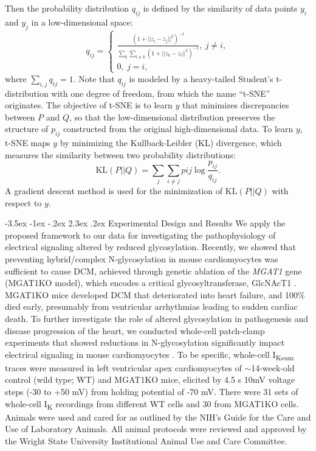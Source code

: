 \documentclass[11pt]{article}
\makeatletter
\renewcommand\section{\@startsection {section}{1}{\z@}%
                                   {-3.5ex \@plus -1ex \@minus -.2ex}%
                                   {2.3ex \@plus.2ex}%
                                   {\normalfont\fontfamily{phv}\fontsize{16}{19}\bfseries}}
\makeatother
\begin{document}
Then the probability distribution $q_{ij}$ is defined by the similarity of data points $y_i$ and $y_j$ in a low-dimensional space:
\begin{equation}
    q_{ij} = 
    \begin{cases}\frac{(1+||z_{i}-z_{j}||^{2})^{-1}}{\sum\limits_{k}\sum\limits_{l \neq k}(1+||z_{k}-z_{l}||^{2})^{-1}}, \ j \neq i, \\
    0, \ j=i,
    \end{cases}
\end{equation}
where $\sum\limits_{i,j}q_{ij}=1$. Note that $q_{ij}$ is modeled by a heavy-tailed Student's t-distribution with one degree of freedom, from which the name ``t-SNE'' originates. The objective of t-SNE is to learn $y$ that minimizes discrepancies between $P$ and $Q$, so that the low-dimensional distribution preserves the structure of $p_{ij}$ constructed from the original high-dimensional data. To learn $y$, t-SNE maps $y$ by minimizing the Kullback-Leibler (KL) divergence, which measures the similarity between two probability distributions:
\begin{equation}
    \mathrm{KL}(P||Q) = \sum\limits_{j}\sum\limits_{i \neq j}p{ij}\log \frac{p_{ij}}{q_{ij}}.
\end{equation}
A gradient descent method is used for the minimization of $\mathrm{KL}(P||Q)$ with respect to $y$.

\section{Experimental Design and Results}
We apply the proposed framework to our data for investigating the pathophysiology of electrical signaling altered by reduced glycosylation. Recently, we showed that preventing hybrid/complex N-glycosylation in mouse cardiomyocytes was sufficient to cause DCM, achieved through genetic ablation of the \textit{MGAT1} gene (MGAT1KO model), which encodes a critical glycosyltransferase, GlcNAcT1 \citep{ednie2019reduced2}. MGAT1KO mice developed DCM that deteriorated into heart failure, and 100\% died early, presumably from ventricular arrhythmias leading to sudden cardiac death. To further investigate the role of altered glycosylation in pathogenesis and disease progression of the heart, we conducted whole-cell patch-clamp experiments that showed reductions in N-glycosylation significantly impact electrical signaling in mouse cardiomyocytes \citep{ednie2019reduced}. To be specific, whole-cell I\textsubscript{Ksum} traces were measured in left ventricular apex cardiomyocytes of $\sim$14-week-old control (wild type; WT) and MGAT1KO mice, elicited by 4.5 s 10mV voltage steps (-30 to +50 mV) from holding potential of -70 mV. There were 31 sets of whole-cell I\textsubscript{K} recordings from different WT cells and 30 from MGAT1KO cells. Animals were used and cared for as outlined by the NIH’s Guide for the Care and Use of Laboratory Animals. All animal protocols were reviewed and approved by the Wright State University Institutional Animal Use and Care Committee.
\end{document}
